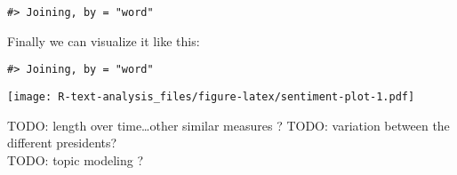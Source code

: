 \documentclass[]{book}
\newenvironment{Shaded}{\begin{snugshade}}{\end{snugshade}}
\newcommand{\CommentTok}[1]{\textcolor[rgb]{0.56,0.35,0.01}{\textit{#1}}}
\newcommand{\DataTypeTok}[1]{\textcolor[rgb]{0.13,0.29,0.53}{#1}}
\newcommand{\DecValTok}[1]{\textcolor[rgb]{0.00,0.00,0.81}{#1}}
\newcommand{\KeywordTok}[1]{\textcolor[rgb]{0.13,0.29,0.53}{\textbf{#1}}}
\newcommand{\NormalTok}[1]{#1}
\newcommand{\OperatorTok}[1]{\textcolor[rgb]{0.81,0.36,0.00}{\textbf{#1}}}
\newcommand{\StringTok}[1]{\textcolor[rgb]{0.31,0.60,0.02}{#1}}
\begin{document}
\begin{verbatim}
#> Joining, by = "word"
\end{verbatim}

Finally we can visualize it like this:

\begin{Shaded}
\end{Shaded}

\begin{verbatim}
#> Joining, by = "word"
\end{verbatim}

\texttt{[image: R-text-analysis\_files/figure-latex/sentiment-plot-1.pdf]}

TODO: length over time\ldots other similar measures ?
TODO: variation between the different presidents?\\
TODO: topic modeling ?


\end{document}
